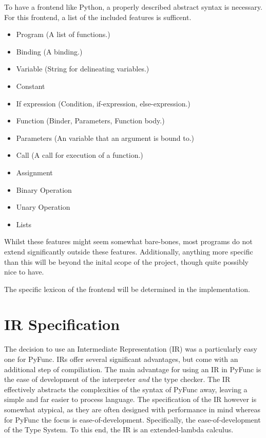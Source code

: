 \documentclass{l4proj}
\begin{document}
To have a frontend like Python, a properly described abstract syntax is necessary.
For this frontend, a list of the included features is sufficent.
\begin{itemize}
    \item Program (A list of functions.)
    \item Binding (A binding.)
    \item Variable (String for delineating variables.)
    \item Constant
    \item If expression (Condition, if-expression, else-expression.)
    \item Function (Binder, Parameters, Function body.)
    \item Parameters (An variable that an argument is bound to.)
    \item Call (A call for execution of a function.)
    \item Assignment
    \item Binary Operation
    \item Unary Operation
    \item Lists
\end{itemize}

Whilst these features might seem somewhat bare-bones, most programs do not extend significantly outside these features.
Additionally, anything more specific than this will be beyond the inital scope of the project, though quite possibly nice to have.

The specific lexicon of the frontend will be determined in the implementation.

\section{IR Specification}
The decision to use an Intermediate Representation (IR) was a particularly easy one for PyFunc.
IRs offer several significant advantages, but come with an additional step of compiliation.
The main advantage for using an IR in PyFunc is the ease of development of the interpreter \emph{and} the type checker.
The IR effectively abstracts the complexities of the syntax of PyFunc away, leaving a simple and far easier to process language.
The specification of the IR however is somewhat atypical, as they are often designed with performance in mind whereas for PyFunc the focus is ease-of-development.
Specifically, the ease-of-development of the Type System.
To this end, the IR is an extended-lambda calculus.
\end{document}
